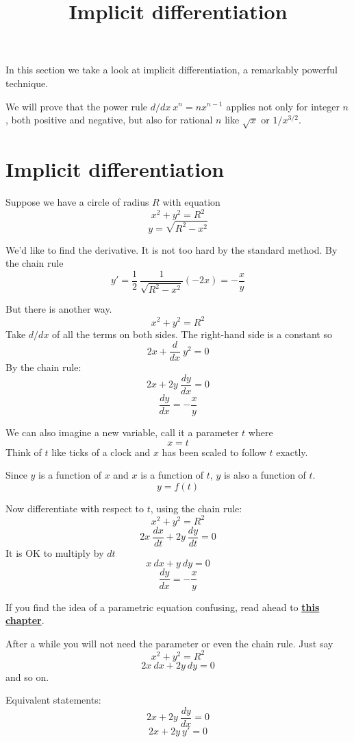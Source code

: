 \documentclass[11pt, oneside]{article}
\title{Implicit differentiation}
\date{}
\begin{document}
\maketitle
\Large
\label{sec:Techniques_of_differentiation}

\label{sec:Implicit_differentiation}

In this section we take a look at implicit differentiation, a remarkably powerful technique.

We will prove that the power rule $d/dx \ x^n = n x^{n-1}$ applies not only for integer $n$, both positive and negative, but also for rational $n$ like $\sqrt{x}$ or $1/x^{3/2}$.

\section*{Implicit differentiation}
Suppose we have a circle of radius $R$ with equation
\[ x^2 + y^2 = R^2 \]
\[ y = \sqrt{R^2 - x^2} \]

We'd like to find the derivative.  It is not too hard by the standard method.  By the chain rule
\[ y' = \frac{1}{2} \ \frac{1}{\sqrt{R^2 - x^2}} (-2x) = -\frac{x}{y} \]

But there is another way.  
\[ x^2 + y^2 = R^2 \]
Take $d/dx$ of all the terms on both sides.  The right-hand side is a constant so
\[ 2x + \frac{d}{dx} \ y^2 = 0 \]
By the chain rule:
\[ 2x + 2y \ \frac{dy}{dx} = 0 \]
\[ \frac{dy}{dx} = - \frac{x}{y} \]

We can also imagine a new variable, call it a parameter $t$ where 
\[ x = t \]
Think of $t$ like ticks of a clock and $x$ has been scaled to follow $t$ exactly.

Since $y$ is a function of $x$ and $x$ is a function of $t$, $y$ is also a function of $t$.
\[ y = f(t) \]

Now differentiate with respect to $t$, using the chain rule:
\[ x^2 + y^2 = R^2 \]
\[ 2x \ \frac{dx}{dt} + 2 y \ \frac{dy}{dt} = 0 \]
It is OK to multiply by $dt$
\[ x \ dx + y \ dy = 0 \]
\[ \frac{dy}{dx} = -\frac{x}{y} \]

If you find the idea of a parametric equation confusing, read ahead to \hyperref[sec:Parametric_equations]{\textbf{this chapter}}.

After a while you will not need the parameter or even the chain rule.  Just say
\[ x^2 + y^2 = R^2 \]
\[ 2x \ dx + 2y \ dy = 0 \]
and so on.

Equivalent statements:
\[ 2x + 2y \ \frac{dy}{dx} = 0 \]
\[ 2x + 2y \ y' = 0 \]
\end{document}
